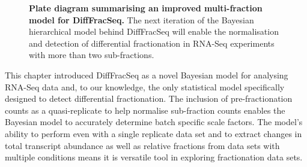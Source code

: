 \documentclass[../main.tex]{subfiles}
\begin{document}
\begin{figure} 
     \centering
     \begin{subfigure}[b]{0.53\textwidth}
     \centering
     \end{subfigure}
     \caption[Graphical representation of the multi-fraction DiffFracSeq Model.]{\textbf{Plate diagram summarising an improved multi-fraction model for DiffFracSeq.} The next iteration of the Bayesian hierarchical model behind DiffFracSeq will enable the normalisation and detection of differential fractionation in RNA-Seq experiments with more than two sub-fractions.}
     \label{fig:DiffFracQuant-future-plate-diagram}
\end{figure}

This chapter introduced DiffFracSeq as a novel Bayesian model for analysing RNA-Seq data and, to our knowledge, the only statistical model specifically designed to detect differential fractionation.
The inclusion of pre-fractionation counts as a quasi-replicate to help normalise sub-fraction counts enables the Bayesian model to accurately determine batch specific scale factors.
The model's ability to perform even with a single replicate data set and to extract changes in total transcript abundance as well as relative fractions from data sets with multiple conditions means it is versatile tool in exploring fractionation data sets.
\end{document}

